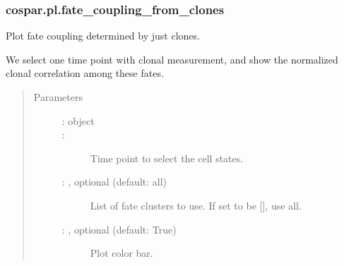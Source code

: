 \documentclass[letterpaper,10pt,english]{sphinxmanual}
\begin{document}
\subsubsection{cospar.pl.fate\_coupling\_from\_clones}
\label{\detokenize{cospar.pl.fate_coupling_from_clones:cospar-pl-fate-coupling-from-clones}}\label{\detokenize{cospar.pl.fate_coupling_from_clones::doc}}

\begin{fulllineitems}
\label{\detokenize{cospar.pl.fate_coupling_from_clones:cospar.pl.fate_coupling_from_clones}}
Plot fate coupling determined by just clones.

We select one time point with clonal measurement, and show the normalized
clonal correlation among these fates.
\begin{quote}\begin{description}
\item[{Parameters}] \leavevmode\begin{description}
\item[{ :  object}] \leavevmode


\item[{ : }] \leavevmode
Time point to select the cell states.

\item[{ : , optional (default: all)}] \leavevmode
List of fate clusters to use. If set to be {[}{]}, use all.

\item[{ : , optional (default: True)}] \leavevmode
Plot color bar.

\end{description}

\end{description}\end{quote}

\end{fulllineitems}
\end{document}
